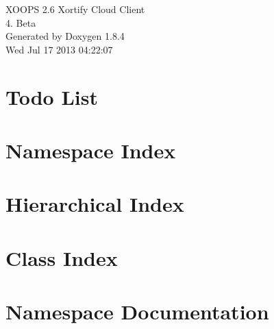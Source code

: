 \documentclass[twoside]{book}
\newcommand{\clearemptydoublepage}{%
  \newpage{\pagestyle{empty}\cleardoublepage}%
}
\begin{document}
\hypersetup{pageanchor=false}
\begin{titlepage}
\vspace*{7cm}
\begin{center}%
{\Large X\-O\-O\-P\-S 2.6 Xortify Cloud Client \\[1ex]\large 4. Beta }\\
\vspace*{1cm}
{\large Generated by Doxygen 1.8.4}\\
\vspace*{0.5cm}
{\small Wed Jul 17 2013 04:22:07}\\
\end{center}
\end{titlepage}
\clearemptydoublepage
\tableofcontents
\clearemptydoublepage
{}
\hypersetup{pageanchor=true}

\chapter{Todo List}
\label{todo}
\hypertarget{todo}{}

\chapter{Namespace Index}

\chapter{Hierarchical Index}

\chapter{Class Index}

\chapter{Namespace Documentation}







\end{document}
